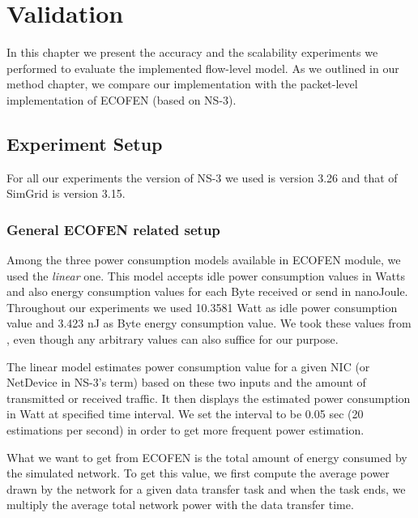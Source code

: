 \chapter{Validation}
\label{chapter:evaluation}
In this chapter we present the accuracy and the scalability experiments we performed to evaluate the implemented flow-level model. As we outlined in our method chapter, we compare our implementation with the packet-level implementation of ECOFEN (based on NS-3).  
\section{Experiment Setup}
For all our experiments the version of NS-3 we used is version 3.26 and that of SimGrid is version 3.15. 
\subsection{General ECOFEN related setup}
Among the three power consumption models available in ECOFEN module, we used the \emph{linear} one. This model accepts idle power consumption values in Watts and also energy consumption values for each Byte received or send in nanoJoule. Throughout our experiments we used 10.3581 Watt as idle power consumption value and 3.423 nJ as Byte energy consumption value. We took these values from \cite{Sivaraman}, even though any arbitrary values can also suffice for our purpose.

The linear model estimates power consumption value for a given NIC (or NetDevice in NS-3's term) based on these two inputs and the amount of transmitted or received traffic. It then displays the estimated power consumption in Watt at specified time interval. We set the interval to be 0.05 sec (20 estimations per second) in order to get more frequent power estimation. 

What we want to get from ECOFEN is the total amount of energy consumed by the simulated network. To get this value, we first compute the average power drawn by the network for a given data transfer task and when the task ends, we multiply the average total network power with the data transfer time. 

